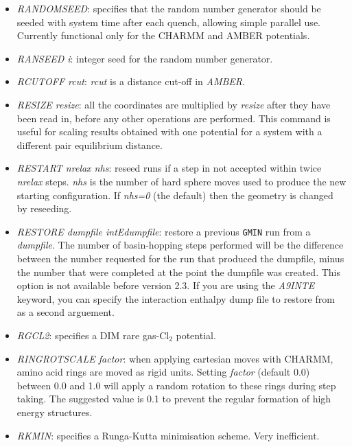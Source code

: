 \documentclass[12pt,a4paper,dvips]{article}
\begin{document}
\begin{itemize}
\item {\it RANDOMSEED\/}: specifies that the random number generator should be seeded with system time after each quench, allowing simple parallel use. Currently functional only for the CHARMM and AMBER potentials.

\item {\it RANSEED i\/}: integer seed for the random number generator.

\item {\it RCUTOFF rcut\/}: {\it rcut\/} is a distance cut-off in {\it AMBER\/}.

\item {\it RESIZE resize\/}: all the coordinates are multiplied by {\it resize\/} after
they have been read in, before any other operations are performed. This command is useful
for scaling results obtained with one potential for a system with a different pair
equilibrium distance.

\item {\it RESTART\/ nrelax nhs\/}: reseed runs if a step in not accepted
within twice {\it nrelax} steps.
{\it nhs} is the number of hard sphere moves used to produce the new starting configuration.
If {\it nhs=0} (the default) then the geometry is changed by reseeding.

\item {\it RESTORE\/ dumpfile intEdumpfile\/}: restore a previous {\tt GMIN} run from a {\it dumpfile}.
The number of basin-hopping steps performed will be the difference between the number
requested for the run that produced the dumpfile, minus the number that were completed
at the point the dumpfile was created. This option is not available before version 2.3.
If you are using the {\it A9INTE\/} keyword, you can specify the interaction enthalpy
dump file to restore from as a second arguement.

\item {\it RGCL2\/}: specifies a DIM rare gas-Cl$_2$ potential.

\item {\it RINGROTSCALE factor\/}: when applying cartesian moves with CHARMM, amino acid rings are moved as rigid units. Setting {\it factor} (default 0.0) between 0.0 and 1.0 will apply a random rotation to these rings during step taking. The suggested value is 0.1 to prevent the regular formation of high energy structures. 

\item {\it RKMIN\/}: specifies a Runga-Kutta minimisation scheme. 
Very inefficient.


\end{itemize}
\end{document}
